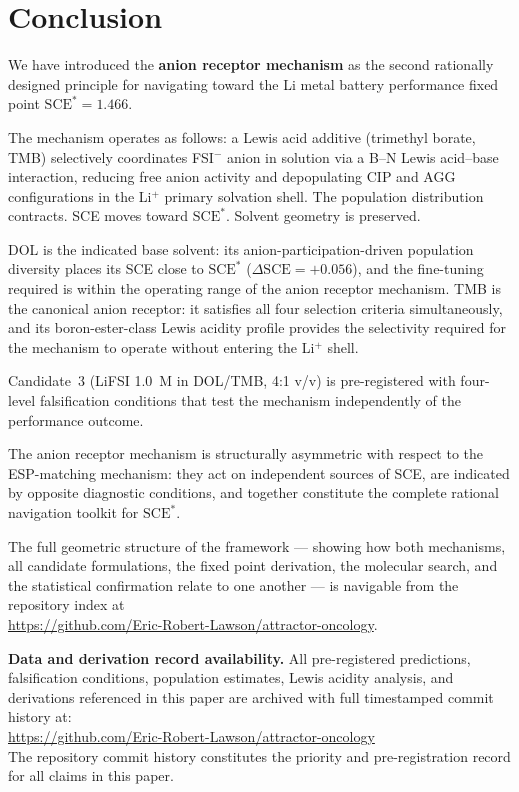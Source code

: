 \documentclass[11pt]{article}
\theoremstyle{plain}
\theoremstyle{definition}
\theoremstyle{remark}
\begin{document}
\section{Conclusion}

We have introduced the \textbf{anion receptor mechanism} as the second
rationally designed principle for navigating toward the Li metal battery
performance fixed point $\mathrm{SCE}^{*} = 1.466$.

The mechanism operates as follows: a Lewis acid additive (trimethyl
borate, TMB) selectively coordinates FSI$^-$ anion in solution via a
B--N Lewis acid--base interaction, reducing free anion activity and
depopulating CIP and AGG configurations in the Li$^+$ primary solvation
shell.  The population distribution contracts.  SCE moves toward
$\mathrm{SCE}^{*}$.  Solvent geometry is preserved.

DOL is the indicated base solvent: its anion-participation-driven
population diversity places its SCE close to $\mathrm{SCE}^{*}$
($\Delta\mathrm{SCE} = +0.056$), and the fine-tuning required is
within the operating range of the anion receptor mechanism.  TMB is
the canonical anion receptor: it satisfies all four selection criteria
simultaneously, and its boron-ester-class Lewis acidity profile
provides the selectivity required for the mechanism to operate without
entering the Li$^+$ shell.

Candidate~3 (LiFSI 1.0~M in DOL/TMB, 4:1 v/v) is pre-registered with
four-level falsification conditions that test the mechanism
independently of the performance outcome.

The anion receptor mechanism is structurally asymmetric with respect
to the ESP-matching mechanism: they act on independent sources of SCE,
are indicated by opposite diagnostic conditions, and together constitute
the complete rational navigation toolkit for $\mathrm{SCE}^{*}$.

The full geometric structure of the framework --- showing how both
mechanisms, all candidate formulations, the fixed point derivation,
the molecular search, and the statistical confirmation relate to one
another --- is navigable from the repository index at\\
\url{https://github.com/Eric-Robert-Lawson/attractor-oncology}.

\bigskip
\noindent\textbf{Data and derivation record availability.}
All pre-registered predictions, falsification conditions, population
estimates, Lewis acidity analysis, and derivations referenced in this
paper are archived with full timestamped commit history at:\\
\url{https://github.com/Eric-Robert-Lawson/attractor-oncology}\\
The repository commit history constitutes the priority and
pre-registration record for all claims in this paper.
\end{document}
